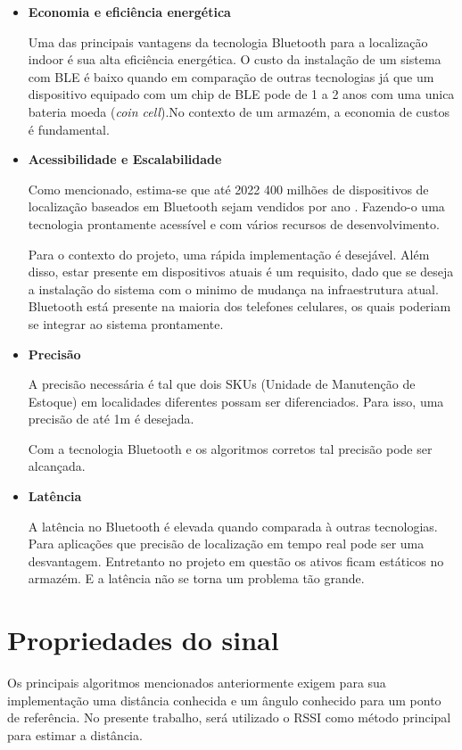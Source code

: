 \begin{itemize}

    \item \textbf{Economia e eficiência energética}
    
    Uma das principais vantagens da tecnologia Bluetooth para a localização indoor é sua alta eficiência energética. O custo da instalação de um sistema com BLE é baixo quando em comparação de outras tecnologias já que um dispositivo equipado com um chip de BLE pode de 1 a 2 anos com uma unica bateria moeda (\textit{coin cell}).No contexto de um armazém, a economia de custos é fundamental.
    
    \item \textbf{Acessibilidade e Escalabilidade} 
    
    Como mencionado, estima-se que até 2022 400 milhões de dispositivos de localização baseados em Bluetooth sejam vendidos por ano \cite{art9}. Fazendo-o uma tecnologia prontamente acessível e com vários recursos de desenvolvimento.

    Para o contexto do projeto, uma rápida implementação é desejável. Além disso, estar presente em dispositivos atuais é um requisito, dado que se deseja a instalação do sistema com o minimo de mudança na infraestrutura atual. Bluetooth está presente na maioria dos telefones celulares, os quais poderiam se integrar ao sistema prontamente.

    \item \textbf{Precisão}

    A precisão necessária é tal que dois SKUs (Unidade de Manutenção de Estoque) em localidades diferentes possam ser diferenciados. Para isso, uma precisão de até 1m é desejada.

    Com a tecnologia Bluetooth e os algoritmos corretos tal precisão pode ser alcançada.

    \item \textbf{Latência}
    
    A latência no Bluetooth é elevada quando comparada à outras tecnologias. Para aplicações que precisão de localização em tempo real pode ser uma desvantagem. Entretanto no projeto em questão os ativos ficam estáticos no armazém. E a latência não se torna um problema tão grande.

\end{itemize}

\section{Propriedades do sinal}
Os principais algoritmos mencionados anteriormente exigem para sua implementação uma distância conhecida e um ângulo conhecido para um ponto de referência. No presente trabalho, será utilizado o RSSI como método principal para estimar a distância. %

